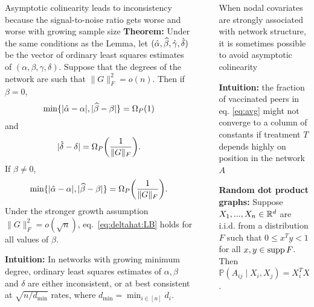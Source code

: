 \documentclass[final]{beamer}
\newlength{\sepwidth}
\newlength{\colwidth}
\newcommand{\separatorcolumn}{\begin{column}{\sepwidth}\end{column}}
\begin{document}
\begin{frame}[t]
\begin{columns}[t]
\begin{column}{\colwidth}
\begin{block}{Asymptotic colinearity leads to inconsistency because the signal-to-noise ratio gets worse and worse with growing sample size}
                \textbf{Theorem:} Under the same conditions as the Lemma, let $(\hat{\alpha}, \widehat{\beta}, \hat{\gamma}, \hat{\delta})$ be the vector of ordinary least squares estimates of $(\alpha, \beta, \gamma, \delta)$. Suppose that the degrees of the network are such that $\| G \|_F^2 = o(n)$.
                Then if $\beta = 0$,
                \begin{equation*}
                    \min\{ |\alphahat-\alpha|, |\betahat-\beta| \}
                    = \Omegap{ 1 }
                \end{equation*}
                and
                \begin{equation} \label{eq:deltahat:LB}
                    | \deltahat - \delta | = \Omegap{ \frac{1}{\|G\|_F} }.
                \end{equation}
                If $\beta \neq 0$,
                \begin{equation*}
                    \min\{ |\alphahat-\alpha|, |\betahat-\beta| \}
                    = \Omegap{ \frac{1}{\|G\|_F} }.
                \end{equation*}
                Under the stronger growth assumption $\|G\|_F^2 = o( \sqrt{n} )$, eq.~\eqref{eq:deltahat:LB} holds for all values of $\beta$.
                \vspace{3mm}

                \textbf{Intuition:} In networks with growing minimum degree, ordinary least squares estimates of $\alpha, \beta$ and $\delta$ are either inconsistent, or at best consistent at $\sqrt{n / d_\mathrm{min}}$ rates, where $d_\mathrm{min} = \min_{i \in [n]} d_i$.
            \end{block}
        \end{column}

        \separatorcolumn

        \begin{column}{\colwidth}
            \begin{block}{When nodal covariates are strongly associated with network structure, it is sometimes possible to avoid asymptotic colinearity}

                \textbf{Intuition:} the fraction of vaccinated peers in eq. \eqref{eq:avg} might not converge to a column of constants if treatment $T$ depends highly on position in the network $A$

                \textbf{Random dot product graphs:} Suppose $X_1, ..., X_n \in \mathbb{R}^d$ are i.i.d. from a distribution $F$ such that $0 \le x^T y < 1$ for all $x,y \in \operatorname*{supp} F$. Then $\mathbb{P}(A_{ij} \mid X_i, X_j) = X_i^T X_j$.


\end{block}
\end{column}
\end{columns}
\end{frame}
\end{document}

